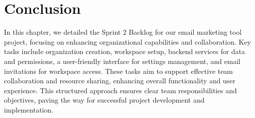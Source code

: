 \section*{Conclusion}


In this chapter, we detailed the Sprint 2 Backlog for our email marketing tool project, focusing on enhancing organizational capabilities and collaboration. Key tasks include organization creation, workspace setup, backend services for data and permissions, a user-friendly interface for settings management, and email invitations for workspace access. These tasks aim to support effective team collaboration and resource sharing, enhancing overall functionality and user experience. This structured approach ensures clear team responsibilities and objectives, paving the way for successful project development and implementation.